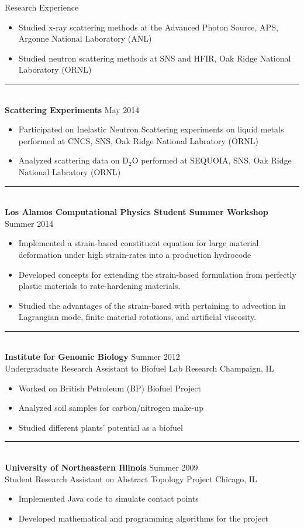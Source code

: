 \documentclass{resume} %
\begin{document}
\begin{rSection}{Research Experience}
	\begin{itemize}
	\item Studied x-ray scattering methods at the Advanced Photon Source, APS, Argonne National Laboratory (ANL)
	\item Studied neutron scattering methods at SNS and HFIR, Oak Ridge National Laboratory (ORNL)
	\end{itemize}
	{\centering\noindent\rule{5cm}{0.4pt}}
	\\
	{\bf Scattering Experiments} \hfill {May 2014}
	\begin{itemize}
	\item Participated on Inelastic Neutron Scattering experiments on liquid metals performed at CNCS, SNS, Oak Ridge National Labratory (ORNL) 
	\item Analyzed scattering data on D$_2$O performed at SEQUOIA, SNS, Oak Ridge National Labratory (ORNL)
	\end{itemize}
	{\centering\noindent\rule{5cm}{0.4pt}}
	\\
	{\bf Los Alamos Computational Physics Student Summer Workshop} \hfill {Summer 2014}
	\begin{itemize}
	\item Implemented a strain-based constituent equation for large material deformation under high strain-rates into a production hydrocode
	\item Developed concepts for extending the strain-based formulation from perfectly plastic materials to rate-hardening materials.
	\item Studied the advantages of the strain-based with pertaining to advection in Lagrangian mode, finite material rotations, and artificial viscosity.
	\end{itemize}
	{\centering\noindent\rule{5cm}{0.4pt}}
	\\
	{\bf Institute for Genomic Biology} \hfill {Summer 2012}\\
	Undergraduate Research Assistant to Biofuel Lab Research \hfill {Champaign, IL}
	\begin{itemize}
	\item Worked on British Petroleum (BP) Biofuel Project
	\item Analyzed soil samples for carbon/nitrogen make-up
	\item Studied different plants' potential as a biofuel
	\end{itemize}
	{\centering\noindent\rule{5cm}{0.4pt}}
	\\
	{\bf University of Northeastern Illinois} \hfill {Summer 2009}\\
	Student Research Assistant on Abstract Topology Project \hfill {Chicago, IL}
	\begin{itemize}
	\item Implemented Java code to simulate contact points
	\item Developed mathematical and programming algorithms for the project
	\end{itemize}
	
\end{rSection}
\end{document}
